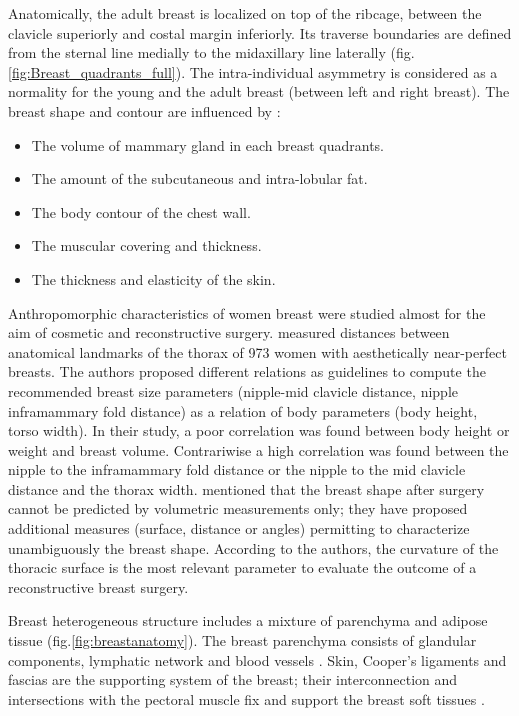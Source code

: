  Anatomically, the adult breast is localized on top of the ribcage, between the clavicle superiorly and costal margin inferiorly. Its traverse boundaries are defined from the sternal line medially to the midaxillary line laterally (fig.\ref{fig:Breast_quadrants_full}). The intra-individual asymmetry is considered as a normality for the young and the adult breast (between left and right breast). The breast shape and contour are influenced by \citep{mugea2014aesthetic}:
 \begin{itemize}
 \item The volume of mammary gland in each breast quadrants.
 \item The amount of the subcutaneous and intra-lobular fat.
 \item The body contour of the chest wall.
 \item The muscular covering and thickness.
 \item The thickness and elasticity of the skin.
 \end{itemize}

Anthropomorphic characteristics of women breast were studied almost for the aim of cosmetic and reconstructive surgery.  \cite{vandeput2002considerations} measured distances between anatomical landmarks of the thorax of 973 women with aesthetically near-perfect breasts. The authors proposed different relations as guidelines to compute the recommended breast size parameters (nipple-mid clavicle distance, nipple inframammary fold distance) as a relation of body parameters (body height, torso width). In their study, a poor correlation was found between body height or weight and breast volume. Contrariwise a high correlation was found between the nipple to the inframammary fold distance or the nipple to the mid clavicle distance and the thorax width. \cite{catanuto2008experimental} mentioned that the breast shape after surgery cannot be predicted by volumetric measurements only; they have proposed additional measures (surface, distance or angles) permitting to characterize unambiguously the breast shape. According to the authors, the curvature of the thoracic surface is the most relevant parameter to evaluate the outcome of a reconstructive breast surgery.


%

\label{subsection:internalstructures}

Breast heterogeneous structure includes a mixture of parenchyma and adipose tissue (fig.\ref{fig:breastanatomy}). The breast parenchyma consists of glandular components, lymphatic network and blood vessels \citep{clemente2011anatomy}. Skin, Cooper's ligaments and fascias are the supporting system of the breast; their interconnection and intersections with the pectoral muscle fix and support the breast soft tissues \citep{mugea2014aesthetic}.

